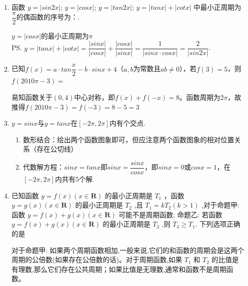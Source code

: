 \begin{enumerate}
\begin{enumerate}
\begin{jieda}
\begin{enumerate}
                \end{enumerate}
            \end{jieda}
        \item 函数
             $y = |sin2x|$; 
             $y = |cosx|$; 
             $y = |tan2x|$; 
             $y = |tanx| + |cotx|$ 
            中最小正周期为$\dfrac{\pi}{2}$的偶函数的序号为：.
            \begin{jieda}
                $y = |cosx|$的最小正周期为$\pi$ \\
                \ps $y = |tanx| + |cotx| = \dfrac{|sinx|}{|cosx|} + \dfrac{|cosx|}{|sinx|} = \dfrac{1}{|sinx \cdot cosx|} = \dfrac{2}{|sin2x|}$.
            \end{jieda}
        \item 已知$f(x) = a \cdot tan\dfrac{x}{2} - b \cdot sinx + 4$（$a, b$为常数且$ab \neq 0$），若$f(3) = 5$，则$f(2010\pi-3)=$
        \begin{jieda}
            易知函数关于$(0, 4)$中心对称，即$f(x) + f(-x) = 8$。函数周期为$2\pi$，故推得$f(2010\pi - 3) = f(-3) = 8 - 5 = 3$
        \end{jieda}
        \item $y = sinx$与$y = tanx$在$[-2\pi, 2\pi]$内有个交点.
        \begin{jieda}
            \begin{enumerate}
                \item 数形结合：绘出两个函数图象即可，但应注意两个函数图象的相对位置关系（存在公切线）
                \item 代数解方程：$sinx = tanx$即$sinx = \dfrac{sinx}{cosx}$，即$sinx = 0$或$cosx = 1$，在$[-2\pi, 2\pi]$内共有5个解.
            \end{enumerate}
        \end{jieda}
        \item 已知函数 $y = f\left( x\right) \left( {x \in  \mathbf{R}}\right)$ 的最小正周期是 ${T}_{1}$ ，函数 $y = g\left( x\right) \left( {x \in  \mathbf{R}}\right)$ 的最小正周期是 ${T}_{2}$ ,且 ${T}_{1} = k{T}_{2}\left( {k > 1}\right)$ ,对于命题甲: 函数 $y = f\left( x\right)  + g\left( x\right) \left( {x \in  \mathbf{R}}\right)$ 可能不是周期函数; 命题乙: 若函数 $y = f\left( x\right)  + g\left( x\right) \left( {x \in  \mathbf{R}}\right)$ 的最小正周期是 ${T}_{3}$ ,则 ${T}_{3} \geq  {T}_{1}$. 下列选项正确的是 
        \begin{jieda}
            对于命题甲: 如果两个周期函数相加,一般来说,它们的和函数的周期会是这两个周期的公倍数(如果存在公倍数的话)。对于周期函数,如果 ${T}_{1}$ 和 ${T}_{2}$ 的比值是有理数,那么它们存在公共周期；如果比值是无理数,通常和函数不是周期函数。
            

\end{jieda}
\end{enumerate}
\end{enumerate}
